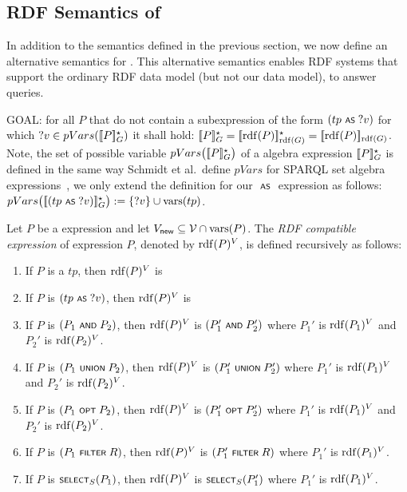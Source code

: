 

\subsection{RDF Semantics of {\SPARQLplus}}
	In addition to the {\SPARQLplus} semantics defined in the previous section, we now define an alternative semantics for {\SPARQLplus}. This alternative semantics enables RDF systems that support the ordinary RDF data model (but not our {\RDFplus} data model), to answer {\SPARQLplus} queries.


GOAL: for all $P$ that do not contain a subexpression of the form $(tp \text{ \normalfont\scriptsize\textsf{AS} } ?v)$ for which $?v \in pVars([\![P]\!]^\star_{G})$ it shall hold: $[\![P]\!]^\star_{G} = [\![\mathrm{rdf}(P)]\!]^\star_{\mathrm{rdf}(G)} = [\![\mathrm{rdf}(P)]\!]_{\mathrm{rdf}(G)}$. Note, the set of possible variable $pVars\bigl([\![P]\!]^\star_{G}\bigr)$ of a {\SPARQLplus} algebra expression $[\![P]\!]^\star_{G}$ is defined in the same way Schmidt et al.~define $pVars$ for SPARQL set algebra expressions~\cite{Schmidt10:FoundationsOfSPARQLOptimization}, we only extend the definition for our $\text{ \normalfont\scriptsize\textsf{AS} }$ expression as follows: $pVars\bigl([\![(tp \text{ \normalfont\scriptsize\textsf{AS} } ?v)]\!]^\star_{G}\bigr) := \lbrace ?v \rbrace \cup \mathrm{vars}(tp)$.

Let $P$ be a {\SPARQLplus} expression and let $V_\mathsf{new} \subseteq \mathcal{V} \cap \mathrm{vars}(P)$.
The \emph{RDF compatible expression} of {\SPARQLplus} expression $P$,
denoted by $\mathrm{rdf}(P)^V$, is defined recursively as follows:
\begin{enumerate}
	\item If $P$ is a {\TPplus} $tp$, then $\mathrm{rdf}(P)^V$ is 
	\item If $P$ is $(tp \text{ \normalfont\scriptsize\textsf{AS} } ?v)$, then $\mathrm{rdf}(P)^V$ is 
	\item If $P$ is $(P_1 \text{ \normalfont\scriptsize\textsf{AND} } P_2)$, then $\mathrm{rdf}(P)^V$ is $(P_1' \text{ \normalfont\scriptsize\textsf{AND} } P_2')$ where $P_1'$ is $\mathrm{rdf}(P_1)^V$ and $P_2'$ is $\mathrm{rdf}(P_2)^V$.
	\item If $P$ is $(P_1 \text{ \normalfont\scriptsize\textsf{UNION} } P_2)$, then $\mathrm{rdf}(P)^V$ is $(P_1' \text{ \normalfont\scriptsize\textsf{UNION} } P_2')$ where $P_1'$ is $\mathrm{rdf}(P_1)^V$ and $P_2'$ is $\mathrm{rdf}(P_2)^V$.
	\item If $P$ is $(P_1 \text{ \normalfont\scriptsize\textsf{OPT} } P_2)$, then $\mathrm{rdf}(P)^V$ is $(P_1' \text{ \normalfont\scriptsize\textsf{OPT} } P_2')$ where $P_1'$ is $\mathrm{rdf}(P_1)^V$ and $P_2'$ is $\mathrm{rdf}(P_2)^V$.
	\item If $P$ is $(P_1 \text{ \normalfont\scriptsize\textsf{FILTER} } R)$, then $\mathrm{rdf}(P)^V$ is $(P_1' \text{ \normalfont\scriptsize\textsf{FILTER} } R)$ where $P_1'$ is $\mathrm{rdf}(P_1)^V$.
	\item If $P$ is $\text{\normalfont\scriptsize\textsf{SELECT}}_S(P_1)$, then $\mathrm{rdf}(P)^V$ is $\text{\normalfont\scriptsize\textsf{SELECT}}_S(P_1')$ where $P_1'$ is $\mathrm{rdf}(P_1)^V$.
\end{enumerate}